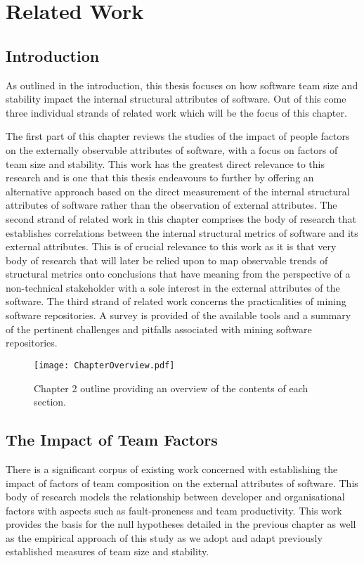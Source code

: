 
\graphicspath{{Chapter2/Figures/}{Chapter2/Tables/}{Chapter2/Charts/}}
\setlength{\parskip}{2ex}

\chapter{Related Work}

\section{Introduction} %
As outlined in the introduction, this thesis focuses on how software team size and stability impact the internal structural attributes of software. Out of this come three individual strands of related work which will be the focus of this chapter. 

The first part of this chapter reviews the studies of the impact of people factors on the externally observable attributes of software, with a focus on factors of team size and stability. This work has the greatest direct relevance to this research and is one that this thesis endeavours to further by offering an alternative approach based on the direct measurement of the internal structural attributes of software rather than the observation of external attributes. The second strand of related work in this chapter comprises the body of research that establishes correlations between the internal structural metrics of software and its external attributes. This is of crucial relevance to this work as it is that very body of research that will later be relied upon to map observable trends of structural metrics onto conclusions that have meaning from the perspective of a non-technical stakeholder with a sole interest in the external attributes of the software. The third strand of related work concerns the practicalities of mining software repositories. A survey is provided of the available tools and a summary of the pertinent challenges and pitfalls associated with mining software repositories.

\begin{figure}[htbp!] 
\centering    
\texttt{[image: ChapterOverview.pdf]}
\caption{Chapter 2 outline providing an overview of the contents of each section.}
\label{fig:ChapterOverview}
\end{figure}

\section{The Impact of Team Factors} %
There is a significant corpus of existing work concerned with establishing the impact of factors of team composition on the external attributes of software. This body of research models the relationship between developer and organisational factors with aspects such as fault-proneness and team productivity. This work provides the basis for the null hypotheses detailed in the previous chapter as well as the empirical approach of this study as we adopt and adapt previously established measures of team size and stability. 

